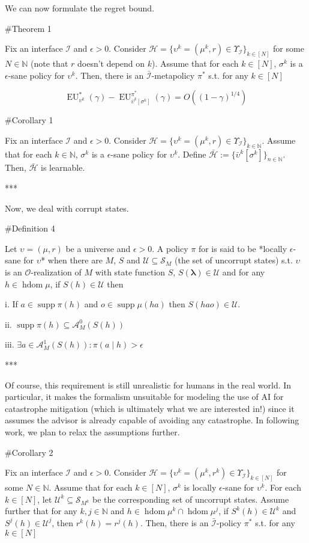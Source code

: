 \documentclass[a4paper]{article}
\DeclareMathOperator{\Supp}{supp}
\newcommand{\Nats}{\mathbb{N}}
\newcommand{\Sq}[2]{\{#1\}_{#2 \in \Nats}}
\newcommand{\Sqn}[1]{\Sq{#1}{n}}
\newcommand{\Estr}{\boldsymbol{\lambda}}
\newcommand{\Ob}{\mathcal{O}}
\newcommand{\A}{\mathcal{A}}
\newcommand{\St}{\mathcal{S}}
\newcommand{\In}{\mathcal{I}}
\DeclareMathOperator{\HD}{hdom}
\newcommand{\Hy}{\mathcal{H}}
\newcommand{\UC}{\mathcal{U}}
\newcommand{\EU}{\operatorname{EU}}
\begin{document}
We can now formulate the regret bound.

\#Theorem 1

Fix an interface $\In$ and $\epsilon > 0$. Consider $\Hy = \{\upsilon^k = (\mu^k,r) \in \Upsilon_{\In}\}_{k \in [N]}$ for some $N \in \Nats$ (note that $r$ doesn't depend on $k$). Assume that for each $k \in [N]$, $\sigma^k$ is a $\epsilon$-sane policy for $\upsilon^k$. Then, there is an $\bar{\In}$-metapolicy $\pi^*$ s.t. for any $k \in [N]$

$$\EU_{\upsilon^k}^*(\gamma) - \EU_{\bar{\upsilon}^k\left[\sigma^k\right]}^{\pi^*}(\gamma) = O\left((1-\gamma)^{1/4}\right)$$

\#Corollary 1

Fix an interface $\In$ and $\epsilon > 0$. Consider $\Hy = \{\upsilon^k = (\mu^k,r) \in \Upsilon_{\In}\}_{k \in \Nats}$. Assume that for each $k \in \Nats$, $\sigma^k$ is a $\epsilon$-sane policy for $\upsilon^k$. Define $\bar{\Hy}:=\Sqn{\bar{\upsilon}^k\left[\sigma^k\right]}$. Then, $\bar{\Hy}$ is learnable.

***

Now, we deal with corrupt states.

\#Definition 4

Let $\upsilon = (\mu,r)$ be a universe and $\epsilon > 0$. A policy $\pi$ for is said to be *locally $\epsilon$-sane for $\upsilon$* when there are $M$, $S$ and $\UC \subseteq \St_M$ (the set of uncorrupt states) s.t. $\upsilon$ is an $\Ob$-realization of $M$ with state function $S$, $S(\Estr) \in \UC$ and for any $h \in \HD{\mu}$, if $S(h) \in \UC$ then

i. If $a \in \Supp{\pi(h)}$ and $o \in \Supp{\mu(ha)}$ then $S\left(hao\right) \in \UC$.

ii. $\Supp{\pi(h)} \subseteq \A_M^0\left(S(h)\right)$

iii. $\exists a \in \A_M^1\left(S(h)\right): \pi(a \mid h) > \epsilon$

***

Of course, this requirement is still unrealistic for humans in the real world. In particular, it makes the formalism unsuitable for modeling the use of AI for catastrophe mitigation (which is ultimately what we are interested in!) since it assumes the advisor is already capable of avoiding any catastrophe. In following work, we plan to relax the assumptions further.

\#Corollary 2

Fix an interface $\In$ and $\epsilon > 0$. Consider $\Hy = \{\upsilon^k = (\mu^k,r^k) \in \Upsilon_{\In}\}_{k \in [N]}$ for some $N \in \Nats$. Assume that for each $k \in [N]$, $\sigma^k$ is locally $\epsilon$-sane for $\upsilon^k$. For each $k \in [N]$, let $\UC^k \subseteq \St_{M^k}$ be the corresponding set of uncorrupt states. Assume further that for any $k,j \in \Nats$ and $h \in \HD{\mu^k} \cap \HD{\mu^j}$, if $S^k(h) \in \UC^k$ and $S^j(h) \in \UC^j$, then $r^k(h)=r^j(h)$. Then, there is an $\bar{\In}$-policy $\pi^*$ s.t. for any $k \in [N]$
\end{document}
